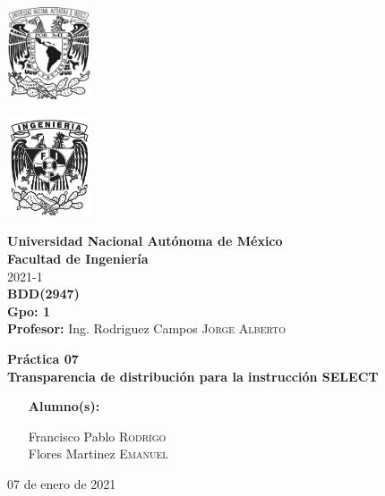 \documentclass{article}
\newcommand{\materia}{BDD}
\newcommand{\clave}{2947}
\newcommand{\profesor}{Ing. Rodriguez Campos \textsc{Jorge Alberto}}
\newcommand{\semestre}{2021-1}
\newcommand{\alumno}{
    Francisco Pablo \textsc{Rodrigo}  \\ 
    Flores Martinez \textsc{Emanuel}   
}
\newcommand{\actividad}{Práctica 07}
\newcommand{\titulo}{Transparencia de distribución para la instrucción SELECT}
\newcommand{\fechaEntrega}{07 de enero de 2021}
\begin{document}
\thispagestyle{empty}
\begin{minipage}[t][5cm][t]{0.2\linewidth}
    \includegraphics[width=2.5cm]{unam.jpg}
    \vspace{10cm}

    \includegraphics[width=2.5cm]{fiblack}
\end{minipage}
\begin{minipage}[t]{0.7\linewidth}
    \vspace{-2.5cm}
    \LARGE{\textbf{Universidad Nacional Autónoma de México}}\\
    \Large{\textbf{Facultad de Ingeniería}} \\

    \large{\semestre}\\[2cm]

    \large{\textbf{\materia (\clave)}}\\
    \large{\textbf{Gpo: 1}}\\[5mm]
    \large{\textbf{Profesor:} \profesor}\\ [1.5cm]
    \begin{center}
        \LARGE{\textbf{\actividad}}\\
        \LARGE{\textbf{\titulo}}\\
    \end{center}

    \vspace{3.3cm}

    \large{
        \begin{itemize}[
            noitemsep,
            align=left,
        ]
            \item [\textbf{Alumno(s):}] 
            \begin{flushright}
                \alumno
            \end{flushright}
        \end{itemize}
    } \vspace{1.5cm}

    \begin{flushright}
        \fechaEntrega%
    \end{flushright}
\end{minipage}
\end{document}
